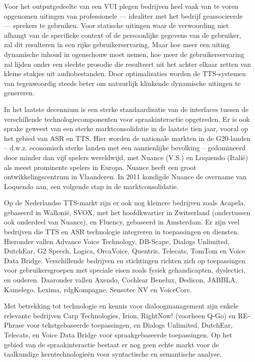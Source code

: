 \documentclass[]{../../metanetpaper}
\begin{document}
\begin{multicols}{2}
    Voor het outputgedeelte van een VUI plegen bedrijven heel vaak van te voren opgenomen uitingen van professionele --- idealiter met het bedrijf geassocieerde --- sprekers te gebruiken. Voor statische uitingen waar de verwoording niet afhangt van de specifieke context of de persoonlijke gegevens van de gebruiker, zal dit resulteren in een rijke gebruikerservaring. Maar hoe meer een uiting dynamische inhoud in ogenschouw moet nemen, hoe meer de gebruikerservaring zal lijden onder een slechte prosodie die resulteert uit het achter elkaar zetten van kleine stukjes uit audiobestanden. Door optimalisaties worden de TTS-systemen van tegenwoordig steeds beter om natuurlijk klinkende dynamische uitingen  te genereren.

    In het laatste decennium is een sterke standaardisatie van de interfaces tussen de verschillende technologiecomponenten voor spraakinteractie opgetreden.  Er is ook sprake geweest van een sterke marktconsolidatie in de laatste tien jaar, vooral op het gebied van ASR en TTS. Hier worden de nationale markten in de G20-landen -- d.w.z. economisch sterke landen met een aanzienlijke bevolking -- gedomineerd door minder dan vijf spelers wereldwijd, met Nuance (V.S.) en Loquendo (Itali{\"e}) als meest prominente spelers in Europa. Nuance heeft een groot ontwikkelingscentrum in Vlaanderen. In 2011 kondigde Nuance de overname van Loquendo aan, een volgende stap in de marktconsolidatie.

    Op de Nederlandse TTS-markt zijn er ook nog kleinere bedrijven zoals Acapela, gebaseerd in Walloni{\"e}, SVOX, met het hoofdkwartier in Zwitserland (ondertussen ook onderdeel van Nuance), en Fluency, gebaseerd in Amsterdam. Er zijn veel bedrijven die TTS en ASR technologie integreren in toepassingen en diensten. Hieronder vallen Advance Voice Technology, DB-Scape, Dialogs Unlimited, DutchEar,   G2 Speech,  Logica, OrcaVoice, Quentris, Telecats, TomTom en Voice Data Bridge. Verschillende bedrijven en stichtingen richten zich op toepassingen voor gebruikersgroepen met speciale eisen zoals fysiek gehandicapten, dyslectici, en ouderen. Daaronder vallen Axendo, Cochlear Benelux, Dedicon, JABBLA, Kamelego, Lexima, rdgKompagne, Sensotec NV en VoiceCore.

    Met betrekking tot technologie en kennis voor dialoogmanagement zijn enkele relevante bedrijven Carp Technologies, Irion, RightNow! (voorheen Q-Go) en  RE-Phrase voor tekstgebaseerde toepassingen, en  Dialogs Unlimited, DutchEar, Telecats, en Voice Data Bridge  voor spraakgebaseerde toepassingen. Op het gebied van de spraakinteractie bestaat er nog geen echte markt voor de taalkundige kerntechnologie{\"e}n voor syntactische en semantische analyse.


\end{multicols}
\end{document}
